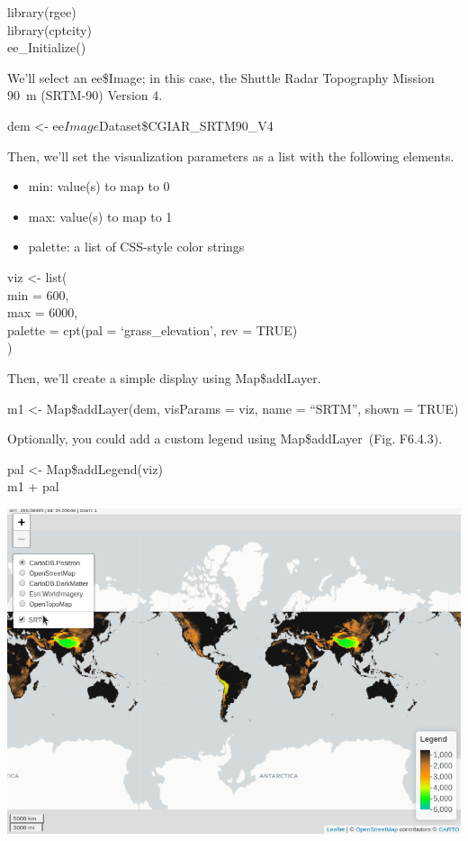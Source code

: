 \documentclass[
  letterpaper,
  DIV=11,
  numbers=noendperiod]{scrreprt}
\providecommand{\tightlist}{%
  \setlength{\itemsep}{0pt}\setlength{\parskip}{0pt}}\usepackage{longtable,booktabs,array}
\begin{document}
library(rgee)\\
library(cptcity)\\
ee\_Initialize()

We'll select an ee\$Image; in this case, the Shuttle Radar Topography
Mission 90~m (SRTM-90) Version 4.

dem \textless- ee\(Image\)Dataset\$CGIAR\_SRTM90\_V4

Then, we'll set the visualization parameters as a list with the
following elements.

\begin{itemize}
\tightlist
\item
  min: value(s) to map to 0
\item
  max: value(s) to map to 1
\item
  palette: a list of CSS-style color strings
\end{itemize}

viz \textless- list(\\
\hspace*{0.333em}min = 600,\\
\hspace*{0.333em}max = 6000,\\
\hspace*{0.333em}palette = cpt(pal = `grass\_elevation', rev = TRUE)\\
)

Then, we'll create a simple display using Map\$addLayer.

m1 \textless- Map\$addLayer(dem, visParams = viz, name = ``SRTM'', shown
= TRUE)

Optionally, you could add a custom legend using Map\$addLayer~(Fig.
F6.4.3).

pal \textless- Map\$addLegend(viz)\\
m1 + pal

\includegraphics{./F6/image28.png}
\end{document}
